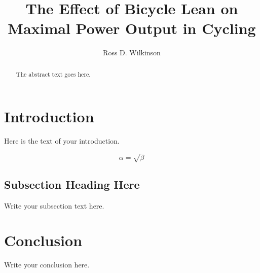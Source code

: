 \documentclass{article}
\begin{document}
\title{The Effect of Bicycle Lean on Maximal Power Output in Cycling}
\author{Ross D. Wilkinson}

\maketitle

\begin{abstract}
The abstract text goes here.
\end{abstract}

\section{Introduction}
Here is the text of your introduction.

\begin{equation}
    \label{simple_equation}
    \alpha = \sqrt{ \beta }
\end{equation}

\subsection{Subsection Heading Here}
Write your subsection text here.

\section{Conclusion}
Write your conclusion here.
\end{document}
